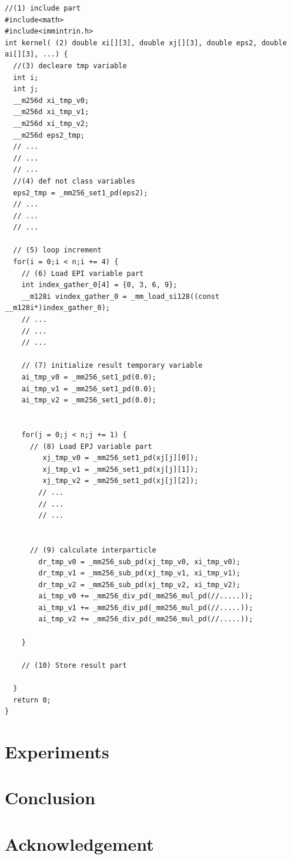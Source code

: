 \documentclass[ams, a4j]{U-AizuGT}
\begin{document}
\begin{lstlisting}[frame=single, caption=hoge]
//(1) include part
#include<math>
#include<immintrin.h>
int kernel( (2) double xi[][3], double xj[][3], double eps2, double ai[][3], ...) {
  //(3) decleare tmp variable
  int i;
  int j;
  __m256d xi_tmp_v0;
  __m256d xi_tmp_v1;  
  __m256d xi_tmp_v2;
  __m256d eps2_tmp;
  // ... 
  // ... 
  // ... 
  //(4) def not class variables
  eps2_tmp = _mm256_set1_pd(eps2);
  // ... 
  // ... 
  // ... 
  
  // (5) loop increment
  for(i = 0;i < n;i += 4) {
    // (6) Load EPI variable part
    int index_gather_0[4] = {0, 3, 6, 9};
    __m128i vindex_gather_0 = _mm_load_si128((const __m128i*)index_gather_0);    
    // ... 
    // ... 
    // ... 

    // (7) initialize result temporary variable
    ai_tmp_v0 = _mm256_set1_pd(0.0);
    ai_tmp_v1 = _mm256_set1_pd(0.0);
    ai_tmp_v2 = _mm256_set1_pd(0.0);


    for(j = 0;j < n;j += 1) {
      // (8) Load EPJ variable part
         xj_tmp_v0 = _mm256_set1_pd(xj[j][0]);
         xj_tmp_v1 = _mm256_set1_pd(xj[j][1]);
         xj_tmp_v2 = _mm256_set1_pd(xj[j][2]);
        // ... 
        // ... 
        // ... 
         

      // (9) calculate interparticle
        dr_tmp_v0 = _mm256_sub_pd(xj_tmp_v0, xi_tmp_v0);
        dr_tmp_v1 = _mm256_sub_pd(xj_tmp_v1, xi_tmp_v1);
        dr_tmp_v2 = _mm256_sub_pd(xj_tmp_v2, xi_tmp_v2);
        ai_tmp_v0 += _mm256_div_pd(_mm256_mul_pd(//.....));
        ai_tmp_v1 += _mm256_div_pd(_mm256_mul_pd(//.....));
        ai_tmp_v2 += _mm256_div_pd(_mm256_mul_pd(//.....));

    }

    // (10) Store result part

  }
  return 0;
}
\end{lstlisting}



\section{Experiments}

\section{Conclusion}
\section{Acknowledgement}

\end{document}
